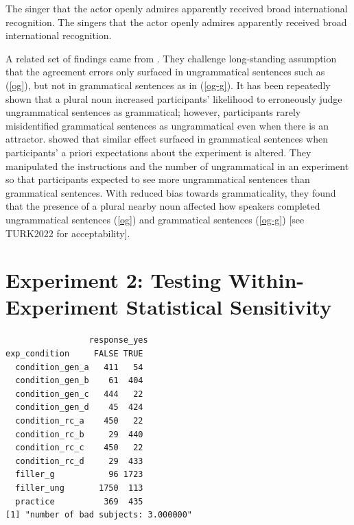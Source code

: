 \documentclass[
  authoryear,
  preprint]{elsarticle}
\begin{document}
\begin{exe}
\ex \label{malsburg}
\begin{xlist}
\ex \label{malsburg-singer} The singer that the actor openly admires apparently received broad international recognition.
\ex \label{malsburg-singers} The singers that the actor openly admires apparently received broad international recognition.
\end{xlist}
\end{exe}

A related set of findings came from \citet{HammerlyEtAl2019}. They
challenge long-standing assumption that the agreement errors only
surfaced in ungrammatical sentences such as (\ref{og}), but not in
grammatical sentences as in (\ref{og-g}). It has been repeatedly shown
that a plural noun increased participants' likelihood to erroneously
judge ungrammatical sentences as grammatical; however, participants
rarely misidentified grammatical sentences as ungrammatical even when
there is an attractor. \citet{HammerlyEtAl2019} showed that similar
effect surfaced in grammatical sentences when participants' a priori
expectations about the experiment is altered. They manipulated the
instructions and the number of ungrammatical in an experiment so that
participants expected to see more ungrammatical sentences than
grammatical sentences. With reduced bias towards grammaticality, they
found that the presence of a plural nearby noun affected how speakers
completed ungrammatical sentences (\ref{og}) and grammatical sentences
(\ref{og-g}) {[}see TURK2022 for acceptability{]}.

\begin{exe}
\end{exe}

\section{Experiment 2: Testing Within-Experiment Statistical
Sensitivity}\label{experiment-2-testing-within-experiment-statistical-sensitivity}

\begin{verbatim}
                 response_yes
exp_condition     FALSE TRUE
  condition_gen_a   411   54
  condition_gen_b    61  404
  condition_gen_c   444   22
  condition_gen_d    45  424
  condition_rc_a    450   22
  condition_rc_b     29  440
  condition_rc_c    450   22
  condition_rc_d     29  433
  filler_g           96 1723
  filler_ung       1750  113
  practice          369  435
[1] "number of bad subjects: 3.000000"
\end{verbatim}
\end{document}
